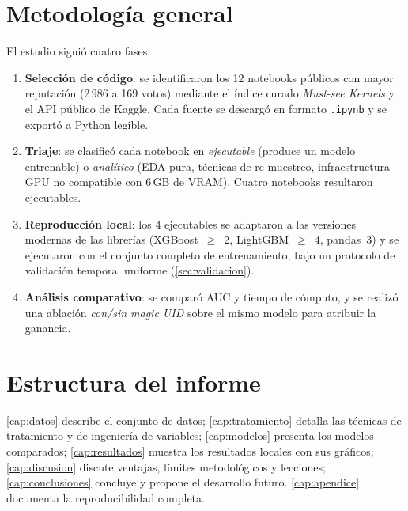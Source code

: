 \section{Metodología general}

El estudio siguió cuatro fases:

\begin{enumerate}
  \item \textbf{Selección de código}: se identificaron los 12 notebooks públicos con mayor
        reputación (2\,986 a 169 votos) mediante el índice curado \emph{Must-see Kernels}
        \cite{mustsee} y el API público de Kaggle. Cada fuente se descargó en formato
        \texttt{.ipynb} y se exportó a Python legible.
  \item \textbf{Triaje}: se clasificó cada notebook en \emph{ejecutable} (produce un modelo
        entrenable) o \emph{analítico} (EDA pura, técnicas de re-muestreo, infraestructura GPU
        no compatible con 6\,GB de VRAM). Cuatro notebooks resultaron ejecutables.
  \item \textbf{Reproducción local}: los 4 ejecutables se adaptaron a las versiones modernas de
        las librerías (XGBoost~$\ge$~2, LightGBM~$\ge$~4, pandas~3) y se ejecutaron con el
        conjunto completo de entrenamiento, bajo un protocolo de validación temporal uniforme
        (\cref{sec:validacion}).
  \item \textbf{Análisis comparativo}: se comparó AUC y tiempo de cómputo, y se realizó una
        ablación \emph{con/sin magic UID} sobre el mismo modelo para atribuir la ganancia.
\end{enumerate}

\section{Estructura del informe}

\cref{cap:datos} describe el conjunto de datos; \cref{cap:tratamiento} detalla las técnicas de
tratamiento y de ingeniería de variables; \cref{cap:modelos} presenta los modelos comparados;
\cref{cap:resultados} muestra los resultados locales con sus gráficos; \cref{cap:discusion}
discute ventajas, límites metodológicos y lecciones; \cref{cap:conclusiones} concluye y propone
el desarrollo futuro. \cref{cap:apendice} documenta la reproducibilidad completa.
